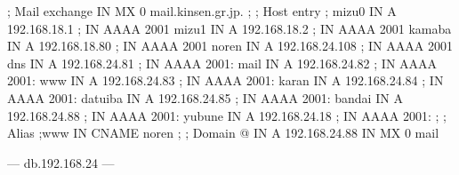 \documentclass[mingoth,a4paper]{jsarticle}
\begin{document}
\begin{itemize}
\begin{commandline}
; Mail exchange
                IN      MX      0 mail.kinsen.gr.jp.
;
; Host entry
;
mizu0           IN      A       192.168.18.1
;               IN      AAAA    2001
mizu1           IN      A       192.168.18.2
;               IN      AAAA    2001
kamaba          IN      A       192.168.18.80
;               IN      AAAA    2001
noren           IN      A       192.168.24.108
;               IN      AAAA    2001
dns             IN      A       192.168.24.81
;               IN      AAAA    2001:
mail            IN      A       192.168.24.82
;               IN      AAAA    2001:
www             IN      A       192.168.24.83
;               IN      AAAA    2001:
karan           IN      A       192.168.24.84
;               IN      AAAA    2001:
datuiba         IN      A       192.168.24.85
;               IN      AAAA    2001:
bandai          IN      A       192.168.24.88
;               IN      AAAA    2001:
yubune          IN      A       192.168.24.18
;               IN      AAAA    2001:
;
; Alias
;www            IN      CNAME    noren
;
; Domain
@               IN      A       192.168.24.88
                IN      MX 0    mail
\end{commandline}
--- db.192.168.24 ---
\clearpage


\end{itemize}
\end{document}
